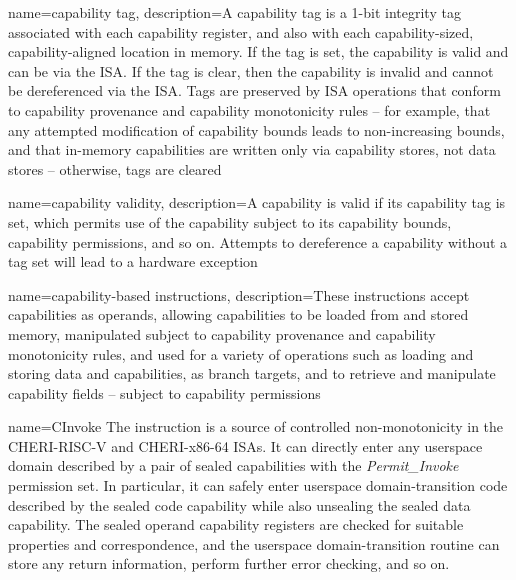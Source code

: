{
  name=capability tag,
  description={A capability tag is a 1-bit integrity tag associated with each
    \gls{capability register}, and also with each capability-sized,
    capability-aligned location in memory.
    If the tag is set, the \gls{capability} is valid and can be
     via the ISA.
    If the tag is clear, then the capability is invalid and cannot be
    dereferenced via the ISA.
    Tags are preserved 
by ISA
operations that conform to \gls{capability
    provenance} and \gls{capability monotonicity} rules -- for example,
    that any attempted modification of \gls{capability bounds} leads to
    non-increasing bounds,
 and that in-memory capabilities are written only
    via capability stores, not data stores -- otherwise, tags are cleared}
%
}

{
  name=capability validity,
  description={A \gls{capability} is valid if its \gls{capability tag}
    is set, which permits use of the capability subject to its
    \gls{capability bounds}, \gls{capability permissions}, and so on.
    Attempts to \gls{dereference} a capability without a tag set will lead
    to a hardware exception}
}

{
  name=capability-based instructions,
  description={These instructions accept capabilities as operands, allowing
    capabilities to be loaded from and stored memory, manipulated subject to
    \gls{capability provenance} and \gls{capability monotonicity} rules,
    and used for a variety of operations such as loading and storing data and
    capabilities, as branch targets, and to retrieve and manipulate capability
    fields -- subject to \gls{capability permissions}}
}

{
  name=CInvoke
}
{
  The  instruction is a source of controlled
  non-monotonicity in the \gls{CHERI-RISC-V} and \gls{CHERI-x86-64} ISAs.
  It can directly enter any userspace domain described by a pair
  of sealed capabilities with the \emph{Permit\_Invoke} permission set.
  In particular, it can
  safely enter userspace domain-transition code
  described by the sealed \gls{code capability} while also unsealing
  the sealed \gls{data capability}.
  The sealed operand \glspl{capability register}
  are checked for suitable properties and correspondence, and the userspace
  domain-transition routine can store any return information, perform further error
  checking, and so on.
}

